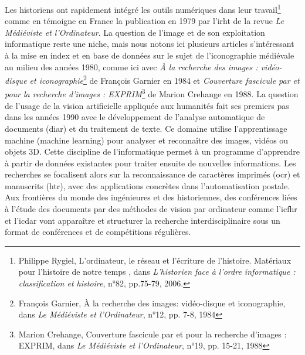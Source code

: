 Les historiens ont rapidement intégré les outils numériques dans leur travail\footnote{Philippe Rygiel, \og L’ordinateur, le réseau et l’écriture de l’histoire. Matériaux pour l’histoire de notre temps \fg, dans \textit{L’historien face à l’ordre informatique : classification et histoire}, n°82, pp.75-79, 2006.} comme en témoigne en France la publication en 1979 par l'\gls{irht} de la revue \textit{Le Médiéviste et l'Ordinateur}. La question de l'image et de son exploitation informatique reste une niche, mais nous notons ici plusieurs articles s'intéressant à la mise en index et en base de données sur le sujet de l'iconographie médiévale au milieu des années 1980, comme ici avec \textit{À la recherche des images : vidéo-disque et iconographie}\footnote{François Garnier, \og À la recherche des images: vidéo-disque et iconographie\fg, dans \textit{Le Médiéviste et l'Ordinateur}, n°12, pp. 7-8, 1984} de François Garnier en 1984 et \textit{Couverture fascicule par et pour la recherche d'images : EXPRIM}\footnote{Marion Crehange, \og Couverture fascicule par et pour la recherche d'images : EXPRIM\fg, dans \textit{Le Médiéviste et l'Ordinateur}, n°19, pp. 15-21, 1988} de Marion Crehange en 1988. 
La question de l’usage de la vision artificielle appliquée aux humanités fait ses premiers pas dans les années 1990 avec le développement de l’analyse automatique de documents (\gls{diar}) et du traitement de texte. Ce domaine utilise l’apprentissage machine (machine learning) pour analyser et reconnaître des images, vidéos ou objets 3D. Cette discipline de l’informatique permet à un programme d’apprendre à partir de données existantes pour traiter ensuite de nouvelles informations. Les recherches se focalisent alors sur la reconnaissance de caractères imprimés (\gls{ocr}) et manuscrits (\gls{htr}), avec des applications concrètes dans l’automatisation postale. Aux frontières du monde des ingénieur\pmm e\pmm s et des historien\pmm ne\pmm s, des conférences liées à l’étude des documents par des méthodes de vision par ordinateur comme l’\gls{icfhr} et l’\gls{icdar} vont apparaître et structurer la recherche interdisciplinaire sous un format de conférences et de compétitions régulières.

